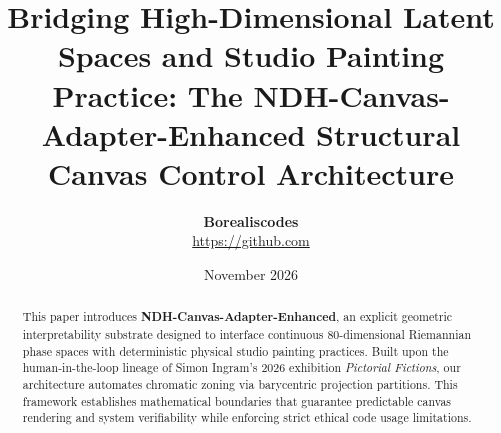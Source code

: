 \documentclass[11pt, letterpaper]{article}
\title{\textbf{Bridging High-Dimensional Latent Spaces and Studio Painting Practice: The NDH-Canvas-Adapter-Enhanced Structural Canvas Control Architecture}}
\author{\textbf{Borealiscodes} \\ \url{https://github.com}}
\date{November 2026}
\begin{document}
\maketitle

\begin{abstract}
This paper introduces \textbf{NDH-Canvas-Adapter-Enhanced}, an explicit geometric interpretability substrate designed to interface continuous 80-dimensional Riemannian phase spaces with deterministic physical studio painting practices. Built upon the human-in-the-loop lineage of Simon Ingram's 2026 exhibition \textit{Pictorial Fictions}, our architecture automates chromatic zoning via barycentric projection partitions. This framework establishes mathematical boundaries that guarantee predictable canvas rendering and system verifiability while enforcing strict ethical code usage limitations.
\end{abstract}

\hr








\end{document}
